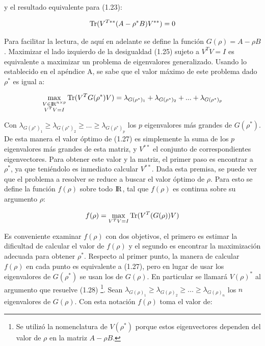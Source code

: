 y el resultado equivalente para (1.23):
	
 \begin{equation} \label{eq:2.27}
	\operatorname{Tr}(V^{T**} (A - \rho^* B )V^{**}) = 0	
 \end{equation}


Para facilitar la lectura, de aquí en adelante se define la función $G(\rho) = A- \rho B$. Maximizar el lado izquierdo de la desigualdad (1.25) sujeto a $V^T V = I$ es equivalente a maximizar un problema de eigenvalores generalizado. Usando lo establecido en el apéndice A, se sabe que el valor máximo de este problema dado $\rho^*$ es igual a:

\begin{equation}\label{eq:2.28}
	\max_{\substack{V \in {\rm I\!R}^{n \times p} \\ V^T V = I}} \operatorname{Tr}(V^T G(\rho^*) V) = \lambda_{G(\rho^*)_1} + \lambda_{G(\rho^*)_2} + ... + \lambda_{G(\rho^*)_p}
\end{equation}
  
 Con $\lambda_{G(\rho^*)_1} \geq \lambda_{G(\rho^*)_2} \geq ... \geq \lambda_{G(\rho^*)_p}$ los $p$ eigenvalores más grandes de $G(\rho^*)$. De esta manera el valor óptimo de (1.27) es simplemente la suma de los $p$ eigenvalores más grandes de esta matriz, y $V^{**}$ el conjunto de correspondientes eigenvectores. Para obtener este valor y la matriz, el primer paso es encontrar a $\rho^*$, ya que teniéndolo es inmediato calcular $V^{**}$. Dada esta premisa, se puede ver que el problema a resolver se reduce a buscar el valor óptimo de $\rho$. Para esto se define la función $f(\rho)$ sobre todo $\rm I\!R$, tal que $f(\rho)$ es continua sobre su argumento $\rho$: 

\begin{equation}  \label{eq:2.29}
	f(\rho) = \max_{V^T V = I} \operatorname{Tr}(V^T (G(\rho)) V)
\end{equation}

Es conveniente examinar $f(\rho)$ con dos objetivos, el primero es estimar la dificultad de calcular el valor de $f(\rho)$ y el segundo es encontrar la maximización adecuada para obtener $\rho^*$. Respecto al primer punto, la manera de calcular $f(\rho)$ en cada punto es equivalente a (1.27), pero en lugar de usar los eigenvalores de $G(\rho^*)$ se usan los de $G(\rho)$. En particular se llamará $V(\rho)^*$ al argumento que resuelve (1.28) \footnote{Se utilizó la nomenclatura de $V(\rho^*)$ porque estos eigenvectores dependen del valor de $\rho$ en la matriz $A - \rho B$.}. Sean $\lambda_{G(\rho)_1} \geq \lambda_{G(\rho)_2} \geq ... \geq \lambda_{G(\rho)_n}$ los $n$ eigenvalores de $G(\rho)$. Con esta notación $f(\rho)$ toma el valor de:


